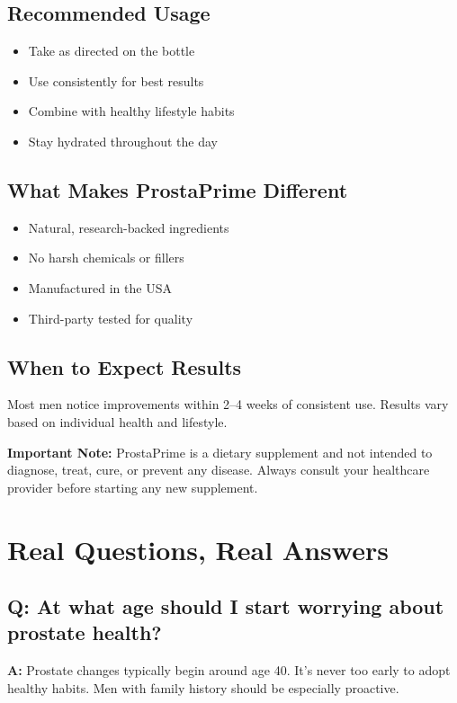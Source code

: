 \documentclass[11pt,oneside,openany]{book}
\begin{document}
\section*{Recommended Usage}
\begin{itemize}[leftmargin=*]
\item Take as directed on the bottle
\item Use consistently for best results
\item Combine with healthy lifestyle habits
\item Stay hydrated throughout the day
\end{itemize}

\section*{What Makes ProstaPrime Different}
\begin{itemize}[leftmargin=*]
\item Natural, research-backed ingredients
\item No harsh chemicals or fillers
\item Manufactured in the USA
\item Third-party tested for quality
\end{itemize}

\section*{When to Expect Results}
Most men notice improvements within 2--4 weeks of consistent use. Results vary based on individual health and lifestyle.

\textbf{Important Note:} ProstaPrime is a dietary supplement and not intended to diagnose, treat, cure, or prevent any disease. Always consult your healthcare provider before starting any new supplement.

\clearpage

\chapter*{Real Questions, Real Answers}

\section*{Q: At what age should I start worrying about prostate health?}
\textbf{A:} Prostate changes typically begin around age 40. It's never too early to adopt healthy habits. Men with family history should be especially proactive.
\end{document}
